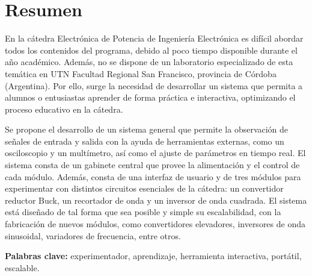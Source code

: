 \section*{Resumen}
\justifying
En la cátedra Electrónica de Potencia de Ingeniería Electrónica es difícil abordar todos los contenidos del programa, debido al poco tiempo disponible durante el año académico. Además, no se dispone de un laboratorio especializado de esta temática en UTN Facultad Regional San Francisco, provincia de Córdoba (Argentina). Por ello, surge la necesidad de desarrollar un sistema que permita a alumnos o entusiastas aprender de forma práctica e interactiva, optimizando el proceso educativo en la cátedra.

Se propone el desarrollo de un sistema general que permite la observación de señales de entrada y salida con la ayuda de herramientas externas, como un osciloscopio y un multímetro, así como el ajuste de parámetros en tiempo real. El sistema consta de un gabinete central que provee la alimentación y el control de cada módulo. Además, consta de una interfaz de usuario y de tres módulos para experimentar con distintos circuitos esenciales de la cátedra: un convertidor reductor Buck, un recortador de onda y un inversor de onda cuadrada. El sistema está diseñado de tal forma que sea posible y simple su escalabilidad, con la fabricación de nuevos módulos, como convertidores elevadores, inversores de onda sinusoidal, variadores de frecuencia, entre otros.

\noindent \textbf{Palabras clave:}
experimentador, aprendizaje, herramienta interactiva, portátil, escalable.

